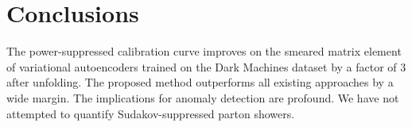 \section{Conclusions}\label{sec:conclusions}

The power-suppressed calibration curve improves on the smeared matrix
element of variational autoencoders trained on the Dark Machines dataset
by a factor of 3 after unfolding. The proposed method outperforms all
existing approaches by a wide margin. The implications for anomaly
detection are profound. We have not attempted to quantify
Sudakov-suppressed parton showers.

